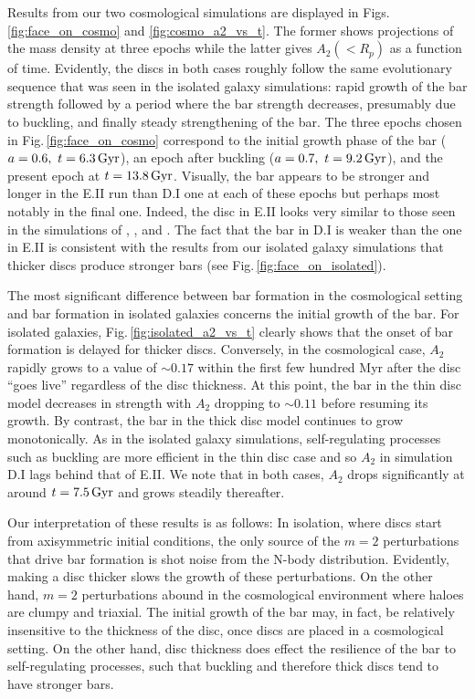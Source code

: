 Results from our two cosmological simulations are displayed in
Figs.\,\ref{fig:face_on_cosmo} and \ref{fig:cosmo_a2_vs_t}.  The
former shows projections of the mass density at three epochs while the
latter gives $A_2(<R_p)$ as a function of time.  Evidently, the discs
in both cases roughly follow the same evolutionary sequence that was seen in
the isolated galaxy simulations: rapid growth of the bar strength
followed by a period where the bar strength decreases,
presumably due to buckling, and finally steady strengthening of the
bar.  The three epochs chosen in Fig.\,\ref{fig:face_on_cosmo}
correspond to the initial growth phase of the bar
($a=0.6,~t=6.3\,{\rm Gyr}$), an epoch after buckling
($a=0.7,~t = 9.2\,{\rm Gyr}$), and the present epoch at
$t=13.8\,{\rm Gyr}$.  Visually, the bar appears to be stronger and
longer in the E.II run than D.I one at each of these epochs but
perhaps most notably in the final one.  Indeed, the disc in E.II looks
very similar to those seen in the simulations of
\citet{DeBuhrStellarDisks}, \citet{YurinSpringelStellarDisks}, and
\citet{Bauer2018a}.  The fact that the bar in D.I is weaker than the
one in E.II is consistent with the results from our isolated galaxy
simulations that thicker discs produce stronger bars (see
Fig.\,\ref{fig:face_on_isolated}).

The most significant difference between bar formation in the
cosmological setting and bar formation in isolated galaxies concerns
the initial growth of the bar.  For isolated galaxies,
Fig.\,\ref{fig:isolated_a2_vs_t} clearly shows that the onset of bar
formation is delayed for thicker discs.  Conversely, in the
cosmological case, $A_2$ rapidly grows to a value of $\sim 0.17$
within the first few hundred Myr after the disc ``goes live''
regardless of the disc thickness.  At this point, the bar in the thin
disc model decreases in strength with $A_2$ dropping to $\sim 0.11$
before resuming its growth.  By contrast, the bar in the thick disc
model continues to grow monotonically.  As in the isolated galaxy
simulations, self-regulating processes such as buckling are more
efficient in the thin disc case and so $A_2$ in simulation D.I lags
behind that of E.II.  We note that in both cases, $A_2$ drops
significantly at around $t=7.5\,{\rm Gyr}$ and grows steadily
thereafter.

Our interpretation of these results is as follows: In isolation, where
discs start from axisymmetric initial conditions, the only source of
the $m=2$ perturbations that drive bar formation is shot noise from
the N-body distribution.  Evidently, making a disc thicker slows the
growth of these perturbations.  On the other hand, $m=2$ perturbations
abound in the cosmological environment where haloes are clumpy and
triaxial.  The initial growth of the bar may, in fact, be relatively
insensitive to the thickness of the disc, once discs are placed in a
cosmological setting.  On the other hand, disc thickness does effect
the resilience of the bar to self-regulating processes, such that
buckling and therefore thick discs tend to have stronger bars.

